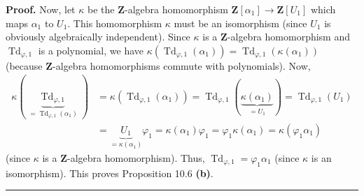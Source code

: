 \documentclass[numbers=enddot,12pt,final,onecolumn,notitlepage]{scrartcl}%
\newenvironment{proof}[1][Proof]{\noindent\textbf{#1.} }{\ \rule{0.5em}{0.5em}}
\begin{document}
\begin{proof}
Now, let $\kappa$ be the $\mathbf{Z}$-algebra homomorphism $\mathbf{Z}\left[
\alpha_{1}\right]  \rightarrow\mathbf{Z}\left[  U_{1}\right]  $ which maps
$\alpha_{1}$ to $U_{1}$. This homomorphism $\kappa$ must be an isomorphism
(since $U_{1}$ is obviously algebraically independent). Since $\kappa$ is a
$\mathbf{Z}$-algebra homomorphism and $\operatorname*{Td}\nolimits_{\varphi
,1}$ is a polynomial, we have $\kappa\left(  \operatorname*{Td}%
\nolimits_{\varphi,1}\left(  \alpha_{1}\right)  \right)  =\operatorname*{Td}%
\nolimits_{\varphi,1}\left(  \kappa\left(  \alpha_{1}\right)  \right)  $
(because $\mathbf{Z}$-algebra homomorphisms commute with polynomials). Now,%
\begin{align*}
\kappa\left(  \underbrace{\operatorname*{Td}\nolimits_{\varphi,1}%
}_{=\operatorname*{Td}\nolimits_{\varphi,1}\left(  \alpha_{1}\right)
}\right)   &  =\kappa\left(  \operatorname*{Td}\nolimits_{\varphi,1}\left(
\alpha_{1}\right)  \right)  =\operatorname*{Td}\nolimits_{\varphi,1}\left(
\underbrace{\kappa\left(  \alpha_{1}\right)  }_{=U_{1}}\right)
=\operatorname*{Td}\nolimits_{\varphi,1}\left(  U_{1}\right) \\
&  =\underbrace{U_{1}}_{=\kappa\left(  \alpha_{1}\right)  }\varphi_{1}%
=\kappa\left(  \alpha_{1}\right)  \varphi_{1}=\varphi_{1}\kappa\left(
\alpha_{1}\right)  =\kappa\left(  \varphi_{1}\alpha_{1}\right)
\end{align*}
(since $\kappa$ is a $\mathbf{Z}$-algebra homomorphism). Thus,
$\operatorname*{Td}\nolimits_{\varphi,1}=\varphi_{1}\alpha_{1}$ (since
$\kappa$ is an isomorphism). This proves Proposition 10.6 \textbf{(b)}.
\end{proof}
\end{document}
